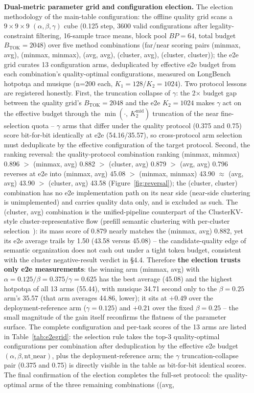 \documentclass[11pt]{article}
\begin{document}
\textbf{Dual-metric parameter grid and configuration election.} The election methodology of the main-table configuration: the offline quality grid scans a $9\times9\times9$ $(\alpha,\beta,\gamma)$ cube (0.125 step, 3600 valid configurations after legality-constraint filtering, 16-sample trace means, block pool $BP{=}64$, total budget $B_{\mathrm{TOK}}{=}2048$) over five method combinations (far/near scoring pairs (minmax, avg), (minmax, minmax), (avg, avg), (cluster, avg), (cluster, cluster)); the e2e grid curates 13 configuration arms, deduplicated by effective e2e budget from each combination's quality-optimal configurations, measured on LongBench hotpotqa and musique (n=200 each, $K_1{=}128$/$K_2{=}1024$). Two protocol lessons are registered honestly. First, the truncation collapse of $\gamma$: the 2$\times$ budget gap between the quality grid's $B_{\mathrm{TOK}}{=}2048$ and the e2e $K_2{=}1024$ makes $\gamma$ act on the effective budget through the $\min(\cdot,\,K_2^{\mathrm{mid}})$ truncation of the near fine-selection quota -- $\gamma$ arms that differ under the quality protocol (0.375 and 0.75) score bit-for-bit identically at e2e (54.16/35.57), so cross-protocol arm selection must deduplicate by the effective configuration of the target protocol. Second, the ranking reversal: the quality-protocol combination ranking (minmax, minmax) 0.896 $>$ (minmax, avg) 0.882 $>$ (cluster, avg) 0.879 $>$ (avg, avg) 0.796 reverses at e2e into (minmax, avg) 45.08 $>$ (minmax, minmax) 43.90 $\approx$ (avg, avg) 43.90 $>$ (cluster, avg) 43.58 (Figure~\ref{fig:reversal}); the (cluster, cluster) combination has no e2e implementation path on its near side (near-side clustering is unimplemented) and carries quality data only, and is excluded as such. The (cluster, avg) combination is the unified-pipeline counterpart of the ClusterKV-style cluster-representative flow (prefill semantic clustering with per-cluster selection~\cite{clusterkv}): its mass score of 0.879 nearly matches the (minmax, avg) 0.882, yet its e2e average trails by 1.50 (43.58 versus 45.08) -- the candidate-quality edge of semantic organization does not cash out under a tight token budget, consistent with the cluster negative-result verdict in \S4.4. Therefore \textbf{the election trusts only e2e measurements}: the winning arm (minmax, avg) with $\alpha{=}0.125/\beta{=}0.375/\gamma{=}0.625$ has the best average (45.08) and the highest hotpotqa of all 13 arms (55.44), with musique 34.71 second only to the $\beta{=}0.25$ arm's 35.57 (that arm averages 44.86, lower); it sits at $+0.49$ over the deployment-reference arm ($\gamma{=}0.125$) and $+0.21$ over the fixed $\beta{=}0.25$ -- the small magnitude of the gain itself reconfirms the flatness of the parameter surface. The complete configuration and per-task scores of the 13 arms are listed in Table~\ref{tab:e2egrid}: the selection rule takes the top-3 quality-optimal configurations per combination after deduplication by the effective e2e budget $(\alpha,\beta,\mathrm{nt\_near})$, plus the deployment-reference arm; the $\gamma$ truncation-collapse pair (0.375 and 0.75) is directly visible in the table as bit-for-bit identical scores. The final confirmation of the election completes the full-set protocol: the quality-optimal arms of the three remaining combinations ((avg, 
\end{document}
